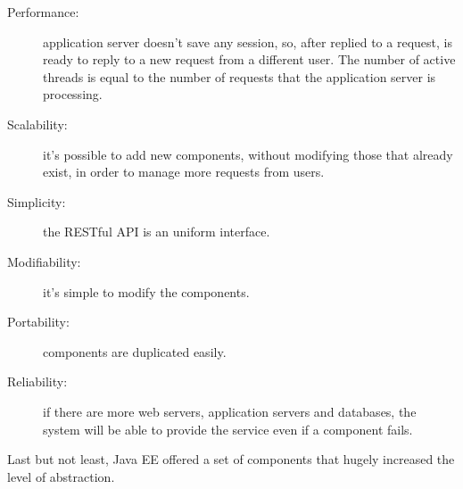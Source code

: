\begin{description}
	\item[Performance:] application server doesn't save any session, so, after replied to a request, is ready to reply to a new request from a different user. The number of active threads is equal to the number of requests that the application server is processing.
	\item[Scalability:] it's possible to add new components, without modifying those that already exist, in order to manage more requests from users.
	\item[Simplicity:] the RESTful API is an uniform interface.
	\item[Modifiability:] it's simple to modify the components. 
	\item[Portability:] components are duplicated easily.
	\item[Reliability:] if there are more web servers, application servers and databases, the system will be able to provide the service even if a component fails.
\end{description}

Last but not least, Java EE offered a set of components that hugely increased the level of abstraction.